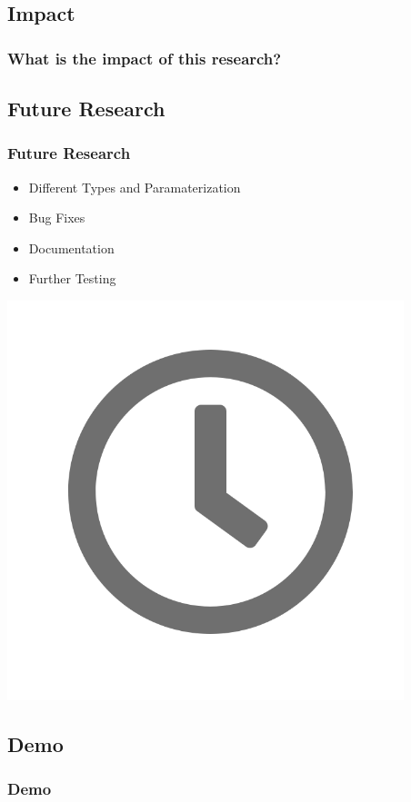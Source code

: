 \subsection{Impact}
\begin{frame}
  \frametitle{What is the impact of this research?}
  \begin{center}
    \begin{table}[htbp]
      \centering
    \end{table}
  \end{center}
\end{frame}

\subsection{Future Research}
\begin{frame}
  \frametitle{Future Research}
  \begin{center}
    \begin{itemize}
      \item {Different Types and Paramaterization}
      \item {Bug Fixes}
      \item {Documentation}
      \item {Further Testing}
    \end{itemize}
    \includegraphics[scale = 0.25]{images/clock}
  \end{center}
\end{frame}

\subsection{Demo}
\begin{frame}
  \frametitle{Demo}
  
\end{frame}
